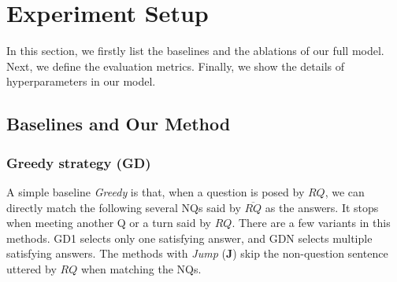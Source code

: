 \section{Experiment Setup}
\label{sec:eval}

In this section, we firstly list the baselines and the ablations of our full model. Next, we define the evaluation metrics. Finally, we show the details of hyperparameters in our model.

\subsection{Baselines and Our Method}
\subsubsection*{Greedy strategy (GD)} 
A simple baseline \textit{Greedy} is that, when a question is posed by $RQ$, we can directly match the following several NQs said by $\overline{RQ}$ as the answers. It stops when meeting another Q or a turn said by $RQ$. 
There are a few variants in this methods. GD1 selects only one satisfying answer, 
and GDN selects multiple satisfying answers. The methods with \textit{Jump} 
(\textbf{J}) skip the non-question sentence uttered by $RQ$ when matching the 
NQs. 



